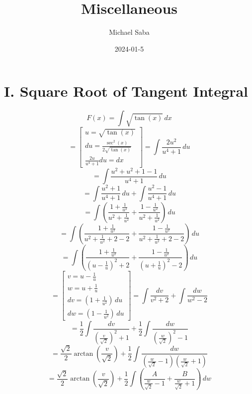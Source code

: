 \documentclass[12pt]{article}
\title{%
    \Huge Miscellaneous \\
}
\date{2024-01-5}
\author{Michael Saba}
\begin{document}
    \maketitle
    \newpage

    \section*{I. Square Root of Tangent Integral}
    \[
        F(x) = \int \sqrt{\tan{(x)}} \, dx 
    \]
    \[
        = \begin{bmatrix}
            u = \sqrt{\tan{(x)}} \\
            du = \frac{\sec^2{(x)}}{2\sqrt{\tan{(x)}}} \\
            \frac{2u}{u^4 + 1}du = dx
        \end{bmatrix} = \int \frac{2u^2}{u^4 + 1} \, du 
    \]
    \[
        = \int \frac{u^2 + u^2 + 1 - 1}{u^4 + 1} \, du 
    \]
    \[
        = \int \frac{u^2 + 1}{u^4 + 1} \, du 
        + \int \frac{u^2 - 1}{u^4 + 1} \, du 
    \]
    \[
        = \int \left(\frac{1 + \frac{1}{u^2}}{u^2 
        + \frac{1}{u^2}} + \frac{1 - \frac{1}{u^2}}{u^2 
        + \frac{1}{u^2}}\right) \, du 
    \]
    \[
        = \int \left(\frac{1 + \frac{1}{u^2}}{u^2 
        + \frac{1}{u^2} + 2 - 2} + \frac{1 - \frac{1}{u^2}}
        {u^2 + \frac{1}{u^2} + 2 - 2}\right) \, du 
    \]
    \[
        = \int \left(\frac{1 + \frac{1}{u^2}}
        {(u - \frac{1}{u})^2 + 2} + \frac{1 - \frac{1}{u^2}}
        {(u + \frac{1}{u})^2 - 2}\right) \, du 
    \]
    \[
        = \begin{bmatrix}
            v = u - \frac{1}{u} \\
            w = u + \frac{1}{u} \\
            dv = (1 + \frac{1}{u^2}) \, du \\
            dw = (1 - \frac{1}{u^2}) \, du
        \end{bmatrix}
        = \int \frac{dv}{v^2 + 2} + \int \frac{dw}{w^2 - 2} 
    \]
    \[
        = \frac{1}{2}\int \frac{dv}{\left(\frac{v}{\sqrt{2}}\right)^2 + 1} 
        + \frac{1}{2}\int \frac{dw}{\left(\frac{w}{\sqrt{2}}\right)^2 - 1} 
    \]
    \[
        = \frac{\sqrt{2}}{2}\arctan{\left(\frac{v}{\sqrt{2}}\right)} 
        + \frac{1}{2}\int \frac{dw}{\left(\frac{w}{\sqrt{2}} - 1\right)
        \left(\frac{w}{\sqrt{2}} + 1\right)} 
    \]
    \[
        = \frac{\sqrt{2}}{2}\arctan{\left(\frac{v}{\sqrt{2}}\right)} 
        + \frac{1}{2}\int \left(\frac{A}{\frac{w}{\sqrt{2}} - 1} + \frac{B}
        {\frac{w}{\sqrt{2}} + 1}\right) \, dw 
    \]
\end{document}
